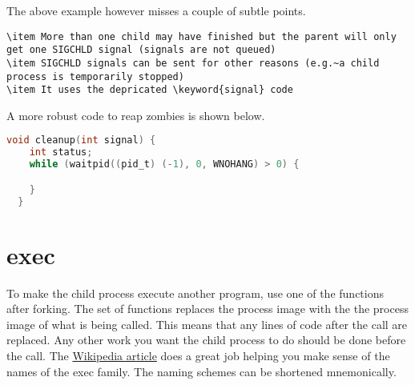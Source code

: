 The above example however misses a couple of subtle points.
\begin{lstlisting}
\item More than one child may have finished but the parent will only get one SIGCHLD signal (signals are not queued)
\item SIGCHLD signals can be sent for other reasons (e.g.~a child process is temporarily stopped)
\item It uses the depricated \keyword{signal} code
\end{lstlisting}

A more robust code to reap zombies is shown below.

\begin{lstlisting}[language=C]
  void cleanup(int signal) {
    int status;
    while (waitpid((pid_t) (-1), 0, WNOHANG) > 0) {

    }
  }
\end{lstlisting}

\section{exec}

To make the child process execute another program, use one of the \href{http://man7.org/linux/man-pages/man3/exec.3.html}{} functions after forking.
The  set of functions replaces the process image with the the process image of what is being called.
This means that any lines of code after the  call are replaced.
Any other work you want the child process to do should be done before the  call.
The \href{https://en.wikipedia.org/wiki/Exec_(system_call)\#C_language_prototypes}{Wikipedia article} does a great job helping you make sense of the names of the exec family.
The naming schemes can be shortened mnemonically.

